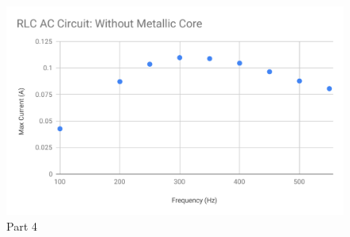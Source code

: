 \begin{figure}[ht]
	\centering
	\includegraphics[scale=0.74]{image/06-RLC/part-4.pdf}
	\caption{Part 4}
	\label{figure.06.part.4.f}
\end{figure}
